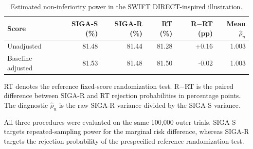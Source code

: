 \begin{table}[!htbp]
\centering
\caption{Estimated non-inferiority power in the SWIFT DIRECT-inspired illustration.}
\label{tab:swift-direct-siga-summary}
\begin{threeparttable}
\small
\setlength{\tabcolsep}{5.5pt}
\renewcommand{\arraystretch}{1.10}
\begin{tabular}{lrrrrr}
\toprule
Score & SIGA-S (\%) & SIGA-R (\%) & RT (\%) & R$-$RT (pp) & Mean $\widehat\rho_n$ \\ 
\midrule
Unadjusted & 81.48 & 81.44 & 81.28 & +0.16 & 1.003 \\
Baseline-adjusted & 81.53 & 81.48 & 81.50 & -0.02 & 1.003 \\
\bottomrule
\end{tabular}
\begin{tablenotes}[flushleft]
\footnotesize
\item RT denotes the reference fixed-score randomization test. R$-$RT is the paired difference between SIGA-R and RT rejection probabilities in percentage points. The diagnostic $\widehat\rho_n$ is the raw SIGA-R variance divided by the SIGA-S variance.
\item All three procedures were evaluated on the same 100,000 outer trials. SIGA-S targets repeated-sampling power for the marginal risk difference, whereas SIGA-R targets the rejection probability of the prespecified reference randomization test.
\end{tablenotes}
\end{threeparttable}
\end{table}

